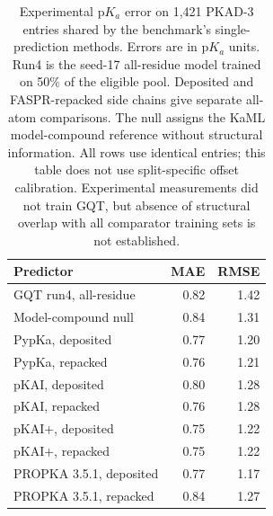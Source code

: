 \begin{table}[p]
    \centering\small
    \begin{tabular}{@{}lrr@{}}
    \toprule
    Predictor & MAE & RMSE \\
    \midrule
    GQT run4, all-residue & 0.82 & 1.42 \\
    Model-compound null & 0.84 & 1.31 \\
    PypKa, deposited & 0.77 & 1.20 \\
    PypKa, repacked & 0.76 & 1.21 \\
    pKAI, deposited & 0.80 & 1.28 \\
    pKAI, repacked & 0.76 & 1.28 \\
    pKAI+, deposited & 0.75 & 1.22 \\
    pKAI+, repacked & 0.75 & 1.22 \\
    PROPKA 3.5.1, deposited & 0.77 & 1.17 \\
    PROPKA 3.5.1, repacked & 0.84 & 1.27 \\
    \bottomrule
    \end{tabular}
    \caption{Experimental $\mathrm{p}K_a$ error on 1,421 PKAD-3 entries shared by the benchmark's single-prediction methods. Errors are in $\mathrm{p}K_a$ units. Run4 is the seed-17 all-residue model trained on 50\% of the eligible pool. Deposited and FASPR-repacked side chains give separate all-atom comparisons. The null assigns the KaML model-compound reference without structural information. All rows use identical entries; this table does not use split-specific offset calibration. Experimental measurements did not train GQT, but absence of structural overlap with all comparator training sets is not established.}
    \label{tab:jaxka-experimental-common}
\end{table}

